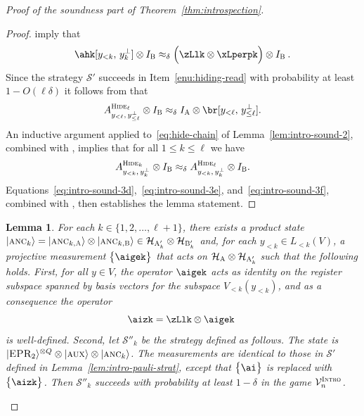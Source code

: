 \documentclass[11pt]{article}
\newtheorem{lemma}[theorem]{Lemma}
\theoremstyle{definition}
\newcommand{\ket}[1]{|#1\rangle}
\newcommand{\Id}{\ensuremath{I}}
\newcommand{\mH}{\ensuremath{\mathcal{H}}}
\newcommand{\ia}{\Id_\alice}
\newcommand{\ib}{\Id_\bob}
\newcommand{\verifier}{\mathcal{V}}
\newcommand{\strategy}{\mathscr{S}}
\newcommand{\gamestyle}[1]{\ensuremath{\textsc{#1}}\xspace}
\newcommand{\intro}{\gamestyle{Intro}}
\newcommand{\labelstyle}[1]{\ensuremath{\textsc{#1}}\xspace}
\newcommand{\EPR}{\labelstyle{EPR}}
\newcommand{\aux}{\labelstyle{aux}}
\newcommand{\ancilla}{\labelstyle{anc}}
\newcommand{\alice}{\labelstyle{A}}
\newcommand{\bob}{\labelstyle{B}}
\newcommand{\typestyle}[1]{\ensuremath{\textsc{#1}}\xspace}
\newcommand{\Hide}[1]{\typestyle{Hide}_{#1}}
\begin{document}
\begin{proof}[Proof of the soundness part of Theorem~\ref{thm:introspection}]
  \begin{proof}
     imply that
    \begin{equation}\label{eq:intro-sound-3d}
      \ahk[y_{<k},\, y^\perp_k] \otimes \ib \approx_\delta
      \Bigl( \zLlk \otimes \xLperpk \Bigr) \otimes \ib\:.
    \end{equation}
    Since the strategy $\strategy'$ succeeds in Item~\ref{enu:hiding-read} with
    probability at least $1 - O(\ell \delta)$ it follows from
     that
    \begin{equation}\label{eq:intro-sound-3e}
      A^{\Hide{\ell}}_{y_{<\ell},\, y^\perp_{\leq \ell}} \otimes \ib
      \approx_\delta \ia \otimes \br[y_{<\ell},\, y^\perp_{\leq
          \ell}].
    \end{equation}
    An inductive argument applied to~\eqref{eq:hide-chain} of
    Lemma~\ref{lem:intro-sound-2}, combined with ,
    implies that for all $1 \leq k \leq \ell$ we have
    \begin{equation}\label{eq:intro-sound-3f}
      A^{\Hide{k}}_{y_{<k},\, y^\perp_{k}} \otimes \ib \approx_\delta A^{\Hide{
          \ell}}_{y_{<k},\, y^\perp_{k}} \otimes \ib.
    \end{equation}
    Equations~\eqref{eq:intro-sound-3d},~\eqref{eq:intro-sound-3e},
    and~\eqref{eq:intro-sound-3f}, combined with ,
    then establishes the lemma statement.
  \end{proof}

  \begin{lemma}
    \label{lem:intro-sound-induction}
    For each $k\in \{1, 2, \ldots, \ell+1\}$, there exists a product state
    $\ket{\ancilla_k} = \ket{\ancilla_{k,\alice}} \otimes
    \ket{\ancilla_{k,\bob}} \in \mH_{\alice'_k} \otimes \mH_{\bob'_k}$ and, for
    each $y_{<k} \in L_{<k}(V)$, a projective measurement $\bigl\{\aigek
    \bigr\}$ that acts on $\mH_{\alice} \otimes \mH_{\alice'_k}$ such that the
    following holds.
		First, for all $y \in V$, the operator $\aigek$ acts as identity on the
    register subspace spanned by basis vectors for the subspace $V_{<
      k}(y_{<k})$, and as a consequence the operator
    \begin{equation}\label{eq:intro-sound-4aa}
      \aizk = \zLlk \otimes \aigek\;
    \end{equation}
    is well-defined.
    Second, let $\strategy''_k$ be the strategy defined as follows.
    The state is $\ket{\EPR_2}^{\otimes Q} \otimes \ket{\aux} \otimes
    \ket{\ancilla_k}$.
    The measurements are identical to those in $\strategy'$ defined in
    Lemma~\ref{lem:intro-pauli-strat}, except that $\bigl\{ \ai \bigr\}$ is
    replaced with $\bigl\{ \aizk \bigr\}$.
    Then $\strategy''_k$ succeeds with probability at least $1-\delta$ in the
    game $\verifier_n^\intro$.
  \end{lemma}
  

\end{proof}
\end{document}
